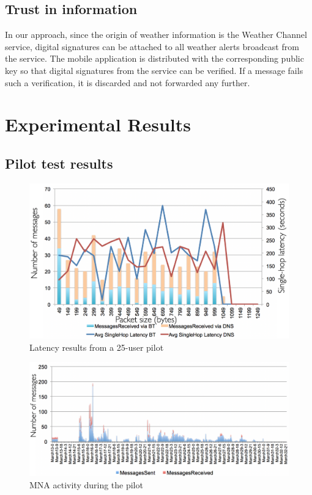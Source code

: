 \documentclass[conference]{IEEEtran}
\begin{document}
%
\subsection{Trust in information}
\label{sec:trust}
%
In our approach, since the origin of weather information is the
Weather Channel service, digital signatures can be attached to all
weather alerts broadcast from the service. The mobile application is
distributed with the corresponding public key so that digital
signatures from the service can be verified. If a message fails such a
verification, it is discarded and not forwarded any further.


%
\section{Experimental Results}
\label{sec:eval}
%

%

%

%
\subsection{Pilot test results}
\label{sec:romania}
%
\begin{figure}[htbp]
\centerline{\includegraphics[width=\columnwidth]{figs/romania_latency}}
\caption{Latency results from a 25-user pilot}
\label{fig:romania_lat}
\end{figure}

\begin{figure}[htbp]
\centerline{\includegraphics[width=\columnwidth]{figs/romania_activity}}
\caption{MNA activity during the pilot}
\label{fig:romania_act}
\end{figure}
\end{document}
